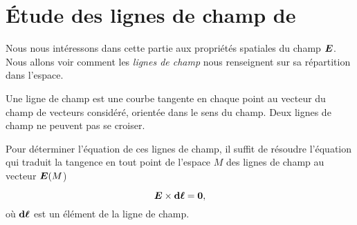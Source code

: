 \section{Étude des lignes de champ de \vece}
Nous nous intéressons dans cette partie aux propriétés spatiales du champ $\vece$.
Nous allons voir comment les \emph{lignes de champ} nous renseignent sur sa répartition 
dans l'espace.

\begin{defn}
	Une ligne de champ est une courbe tangente en chaque point au vecteur 
	du champ de vecteurs considéré, orientée dans le sens du champ. Deux
	lignes de champ ne peuvent pas se croiser.
\end{defn}

Pour déterminer l'équation de ces lignes de champ, il suffit de résoudre l'équation
qui traduit la tangence en tout point de l'espace $M$ des lignes de champ 
au vecteur $\vece(M$)

\begin{equation}
	\vece \times \dl = \mitbf{0},
\end{equation}
où $\dl$ est un élément de la ligne de champ.



